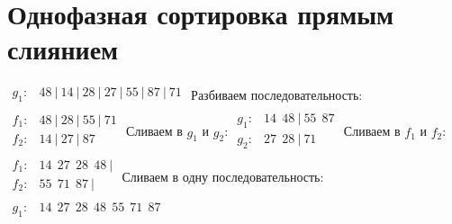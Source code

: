 \documentclass{article}
\begin{document}
\section*{Однофазная сортировка прямым слиянием}
$\begin{array}{rl}
        g_1: & 48 ~|~ 14 ~|~ 28 ~|~ 27 ~|~ 55 ~|~ 87 ~|~ 71 \\
    \end{array}$ \newline
Разбиваем последовательность:
$\begin{array}{rl}
        f_1: & 48 ~|~ 28 ~|~ 55 ~|~ 71 \\
        f_2: & 14 ~|~ 27 ~|~ 87        \\
    \end{array}$ \newline
Сливаем в $g_1$ и $g_2$:
$\begin{array}{rl}
        g_1: & 14 ~~ 48 ~|~ 55 ~~ 87 \\
        g_2: & 27 ~~ 28 ~|~ 71       \\
    \end{array}$ \newline
Сливаем в $f_1$ и $f_2$:
$\begin{array}{rl}
        f_1: & 14 ~~ 27 ~~ 28 ~~ 48 ~| \\
        f_2: & 55 ~~ 71 ~~ 87 ~|       \\
    \end{array}$ \newline
Сливаем в одну последовательность:
$\begin{array}{rl}
        g_1: & 14 ~~ 27 ~~ 28 ~~ 48 ~~ 55 ~~ 71 ~~ 87 \\
    \end{array}$ \newline
\end{document}
